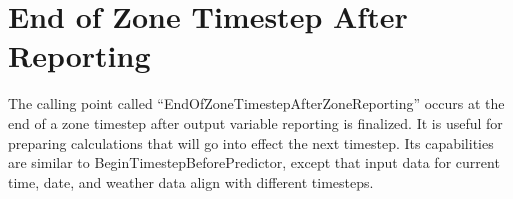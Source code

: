 \section{End of Zone Timestep After Reporting}\label{end-of-zone-timestep-after-reporting}

The calling point called ``EndOfZoneTimestepAfterZoneReporting'' occurs at the end of a zone timestep after output variable reporting is finalized. It is useful for preparing calculations that will go into effect the next timestep. Its capabilities are similar to BeginTimestepBeforePredictor, except that input data for current time, date, and weather data align with different timesteps.
